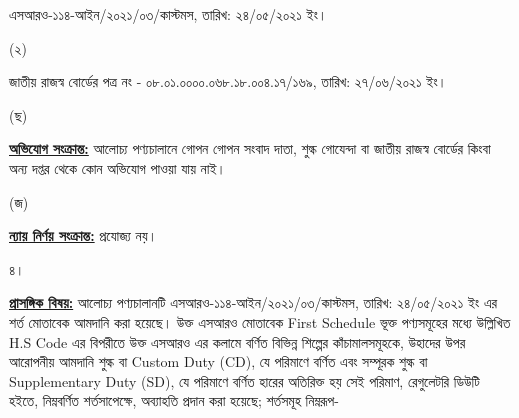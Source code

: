 \documentclass[12pt]{article}
\newcommand{\srooof}{এসআরও-১১৪-আইন/২০২১/০৩/কাস্টমস}
\newcommand{\srooofd}{তারিখ: ২৪/০৫/২০২১ ইং}
\newcommand{\nbrl}{জাতীয় রাজস্ব বোর্ডের পত্র নং - ০৮.০১.০০০০.০৬৮.১৮.০০৪.১৭/১৬৯}
\newcommand{\nbrld}{তারিখ: ২৭/০৬/২০২১ ইং}
\begin{document}
\begin{minipage}[t]{0.85\linewidth}
{\srooof}, {\srooofd}।
\end{minipage}
\begin{minipage}[t]{0.1\linewidth}
\hspace{1em}
\end{minipage}
\begin{minipage}[t]{0.05\linewidth}
(২)
\end{minipage}
\begin{minipage}[t]{0.85\linewidth}
{\nbrl}, {\nbrld}।
\\
\end{minipage}
\begin{minipage}[t]{0.05\linewidth}
\hspace{1em}
\end{minipage}
\begin{minipage}[t]{0.05\linewidth}
(ছ)
\end{minipage}
\begin{minipage}[t]{0.90\linewidth}
\underline{\textbf{অভিযোগ সংক্রান্ত:}} আলোচ্য পণ্যচালানে গোপন
গোপন সংবাদ দাতা, শুল্ক গোযেন্দা বা
জাতীয় রাজস্ব বোর্ডের কিংবা অন্য দপ্তর থেকে
কোন অভিযোগ পাওয়া যায় নাই।
\\
\end{minipage}
\begin{minipage}[t]{0.05\linewidth}
\hspace{1em}
\end{minipage}
\begin{minipage}[t]{0.05\linewidth}
(জ)
\end{minipage}
\begin{minipage}[t]{0.90\linewidth}
\underline{\textbf{ন্যায় নির্ণয় সংক্রান্ত:}} প্রযোজ্য নয়।
\\
\end{minipage}
\begin{minipage}[t]{0.05\linewidth}
৪।
\end{minipage}
\begin{minipage}[t]{0.95\linewidth}
\underline{\textbf{প্রাসঙ্গিক বিষয়:}} আলোচ্য পণ্যচালানটি {\srooof}, {\srooofd}
এর শর্ত মোতাবেক আমদানি করা হয়েছে।
উক্ত এসআরও মোতাবেক First Schedule
ভূক্ত পণ্যসমূহের মধ্যে উল্লিখিত H.S Code
এর বিপরীতে উক্ত এসআরও এর কলামে বর্ণিত
বিভিন্ন শিল্পের কাঁচামালসমূহকে, উহাদের উপর
আরোপনীয় আমদানি শুল্ক বা Custom Duty (CD),
যে পরিমাণে বর্ণিত এবং সম্পূরক শুল্ক বা
Supplementary Duty (SD),
যে পরিমাণে বর্ণিত হারের অতিরিক্ত হয় সেই পরিমাণ,
রেগুলেটরি ডিউটি হইতে, নিম্নবর্ণিত শর্তসাপেক্ষে,
অব্যাহতি প্রদান করা হয়েছে; শর্তসমূহ নিম্নরূপ-
\\
\end{minipage}
\end{document}
